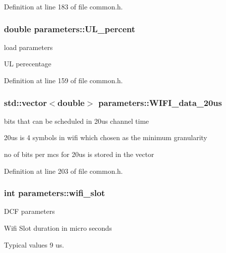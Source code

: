 Definition at line 183 of file common.\-h.

\hypertarget{structparameters_ad4364f715b9733da85943ab6bd565668}{
\subsubsection[{U\-L\-\_\-percent}]{\setlength{\rightskip}{0pt plus 5cm}double parameters\-::\-U\-L\-\_\-percent}}\label{structparameters_ad4364f715b9733da85943ab6bd565668}
load parameters \par
U\-L perecentage \par


Definition at line 159 of file common.\-h.

\hypertarget{structparameters_a43e6f6e73d1ad0d57f816679cbbfd5a8}{
\subsubsection[{W\-I\-F\-I\-\_\-data\-\_\-20us}]{\setlength{\rightskip}{0pt plus 5cm}std\-::vector$<$double$>$ parameters\-::\-W\-I\-F\-I\-\_\-data\-\_\-20us}}\label{structparameters_a43e6f6e73d1ad0d57f816679cbbfd5a8}
bits that can be scheduled in 20us channel time \par
20us is 4 symbols in wifi which chosen as the minimum granularity \par
no of bits per mcs for 20us is stored in the vector \par


Definition at line 203 of file common.\-h.

\hypertarget{structparameters_a771941f653f52f2c398deae9f44e82d5}{
\subsubsection[{wifi\-\_\-slot}]{\setlength{\rightskip}{0pt plus 5cm}int parameters\-::wifi\-\_\-slot}}\label{structparameters_a771941f653f52f2c398deae9f44e82d5}
D\-C\-F parameters \par
Wifi Slot duration in micro seconds \par
Typical values 9 us. \par


